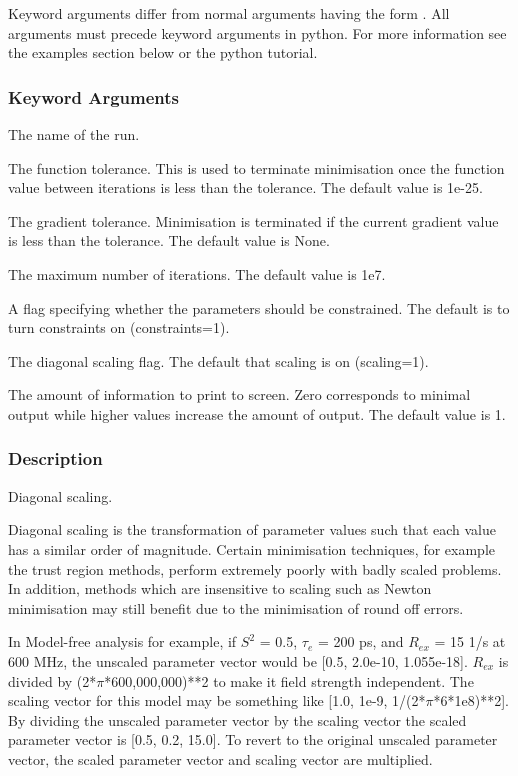 Keyword arguments differ from normal arguments having the form 
.  All
arguments must precede keyword arguments in python.   For more information see the examples
section below or the python  tutorial.


\subsubsection{Keyword Arguments}


  The name of the run.

  The function tolerance.  This is used to terminate minimisation  once the function value between iterations is less than the tolerance.  The default value is 1e-25.

  The gradient tolerance.  Minimisation  is terminated if the current gradient value is less than the tolerance.  The default value is None.

  The maximum number of iterations.  The default value is 1e7.

  A flag specifying whether the parameters should be constrained.  The default is to turn constraints  on (constraints=1).

  The diagonal scaling flag.  The default that scaling is on (scaling=1).


  The amount of information to print to screen.  Zero corresponds to minimal output while higher values increase the amount of output.  The default value is 1.

\subsubsection{Description}

Diagonal scaling.

Diagonal scaling is the transformation of parameter values such that each value has a
similar order of magnitude.  Certain minimisation  techniques, for example the trust region
methods, perform extremely poorly with badly scaled problems.  In addition, methods which
are insensitive to scaling such as Newton  minimisation  may still benefit due to the
minimisation  of round off errors.

In Model-free analysis for example, if $S^2$ = 0.5, $\tau_e$ = 200 ps, and $R_{ex}$ = 15 1/s at 600 MHz,
the unscaled parameter vector would be [0.5, 2.0e-10, 1.055e-18].  $R_{ex}$ is divided by
(2*$\pi$*600,000,000)**2 to make it field strength independent.  The scaling vector for this
model may be something like [1.0, 1e-9, 1/(2*$\pi$*6*1e8)**2].  By dividing the unscaled
parameter vector by the scaling vector the scaled parameter vector is [0.5, 0.2, 15.0].  To
revert to the original unscaled parameter vector, the scaled parameter vector and scaling
vector are multiplied.


